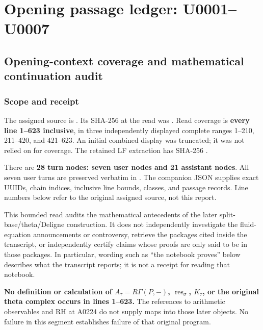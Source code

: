\documentclass[10pt,a4paper,oneside]{report}
\begin{document}
\section{Opening passage ledger:
U0001--U0007}\label{opening-passage-ledger-u0001u0007}

\subsection{Opening-context coverage and mathematical continuation
audit}\label{opening-context-coverage-and-mathematical-continuation-audit}

\subsubsection{Scope and receipt}\label{scope-and-receipt}

The assigned source is
\protect{}.
Its SHA-256 at the read was
\protect{}.
Read coverage is \textbf{every line 1--623 inclusive}, in three
independently displayed complete ranges 1--210, 211--420, and 421--623.
An initial combined display was truncated; it was not relied on for
coverage. The retained LF extraction
\protect{} has SHA-256
\protect{}.

There are \textbf{28 turn nodes: seven user nodes and 21 assistant
nodes}. All seven user turns are preserved verbatim in
\protect{}. The companion JSON supplies
exact UUIDs, chain indices, inclusive line bounds, classes, and passage
records. Line numbers below refer to the original assigned source, not
this report.

This bounded read audits the mathematical antecedents of the later
split-base/theta/Deligne construction. It does not independently
investigate the fluid-equation announcements or controversy, retrieve
the packages cited inside the transcript, or independently certify
claims whose proofs are only said to be in those packages. In
particular, wording such as ``the notebook proves'' below describes what
the transcript reports; it is not a receipt for reading that notebook.

\textbf{No definition or calculation of \(A_\tau=R\Gamma(P,-)\),
\(\operatorname{res}_\sigma\), \(K_\tau\), or the original theta complex
occurs in lines 1--623.} The references to arithmetic observables and RH
at A0224 do not supply maps into those later objects. No failure in this
segment establishes failure of that original program.
\end{document}
